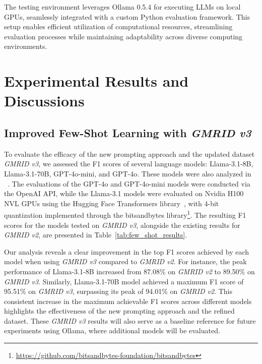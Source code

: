\documentclass[conference]{IEEEtran}
\begin{document}

The testing environment leverages Ollama 0.5.4 for executing LLMs on local GPUs, seamlessly integrated with a custom Python evaluation framework.
This setup enables efficient utilization of computational resources, streamlining evaluation processes while maintaining adaptability across diverse computing environments.

\section{Experimental Results and Discussions}

\subsection{Improved Few-Shot Learning with \textit{GMRID v3}}

To evaluate the efficacy of the new prompting approach and the updated dataset \textit{GMRID v3}, we assessed the F1 scores of several language models: Llama-3.1-8B, Llama-3.1-70B, GPT-4o-mini, and GPT-4o. These models were also analyzed in ~\cite{huang2024automating}. The evaluations of the GPT-4o and GPT-4o-mini models were conducted via the OpenAI API, while the Llama-3.1 models were evaluated on Nvidia H100 NVL GPUs using the Hugging Face Transformers library~\cite{wolf2020transformers}, with 4-bit quantization implemented through the bitsandbytes library\footnote{\url{https://github.com/bitsandbytes-foundation/bitsandbytes}}. The resulting F1 scores for the models tested on \textit{GMRID v3}, alongside the existing results for \textit{GMRID v2}, are presented in Table~\ref{tab:few_shot_results}.

Our analysis reveals a clear improvement in the top F1 scores achieved by each model when using \textit{GMRID v3} compared to \textit{GMRID v2}. For instance, the peak performance of Llama-3.1-8B increased from 87.08\% on \textit{GMRID v2} to 89.50\% on \textit{GMRID v3}. Similarly, 
Llama-3.1-70B model achieved a maximum F1 score of 95.51\% on \textit{GMRID v3}, surpassing its peak of 94.01\% on \textit{GMRID v2}. 
This consistent increase in the maximum achievable F1 scores across different models highlights the effectiveness of the new prompting approach and the refined dataset. These \textit{GMRID v3} results will also serve as a baseline reference for future experiments using Ollama, where additional models will be evaluated.
\end{document}
